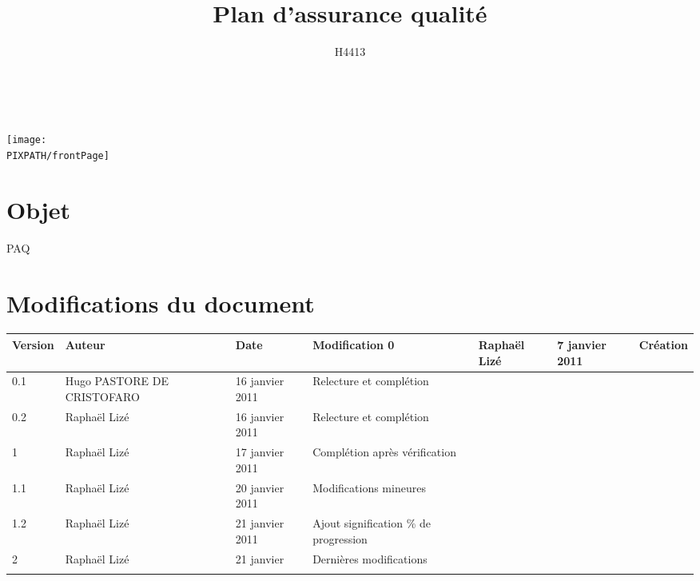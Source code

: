 \documentclass[twoside]{article}
\title{Plan d'assurance qualité}
\author{H4413}
\newcommand\PIXPATH{./docs/pics}
\newcommand\Object{PAQ}
\begin{document}



\maketitle

\thispagestyle{empty}

\hfill\\
\vfill


\begin{center}
    \texttt{[image: \\PIXPATH/frontPage]}
\end{center}

\section*{Objet}
\Object



\section*{Modifications du document}

\begin{center}
\begin{longtable}{|m{14mm}|m{36mm}|m{36mm}|m{60mm}|}
\hline
Version & Auteur & Date & Modification\endhead \hline
0
& %
Raphaël Lizé
& %
7 janvier 2011
& %
Création
\\\hline
0.1
& %
Hugo PASTORE DE CRISTOFARO
& %
16 janvier 2011
& %
Relecture et complétion
\\\hline
0.2
& %
Raphaël Lizé
& %
16 janvier 2011
& %
Relecture et complétion
\\\hline
1
& %
Raphaël Lizé
& %
17 janvier 2011
& %
Complétion après vérification
\\\hline
1.1
& %
Raphaël Lizé
& %
20 janvier 2011
& %
Modifications mineures
\\\hline
1.2
& %
Raphaël Lizé
& %
21 janvier 2011
& %
Ajout signification \% de progression
\\\hline
2
& %
Raphaël Lizé
& %
21 janvier
& %
Dernières modifications
\\\hline

& %

& %

& %

\\\hline
\end{longtable}
\end{center}
\end{document}
